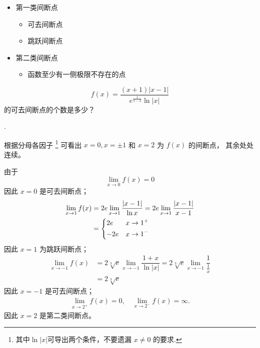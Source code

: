 \begin{itemize}
    \item 第一类间断点
        \begin{itemize} 
            \item 可去间断点
            \item 跳跃间断点
        \end{itemize}
    \item 第二类间断点
        \begin{itemize}
            \item 函数至少有一侧极限不存在的点
        \end{itemize}
\end{itemize}

\begin{example}
    \[
        f(x) = \dfrac{(x+1) | x-1 |}{e^{\frac{1}{x-2}} \ln |x|}
    \]
    的可去间断点的个数是多少？

    \cite[page 46, pdf 57, example 4]{we}.

    根据分母各因子
    \footnote{其中$\ln |x|$可导出两个条件，不要遗漏 $x \neq 0$ 的要求.}
    可看出 $x = 0, x = \pm 1$ 和 $x = 2$ 为 $f(x)$ 的间断点，
    其余处处连续。

    由于
    \[
        \lim_{x \to 0} f(x) = 0
    \]
    因此 $x = 0$ 是可去间断点；
    \begin{align*}
        \lim_{x \to 1} f(x) &= 2e \lim_{x\to 1} \dfrac{|x - 1|}{\ln x} = 2e \lim_{x\to 1} \dfrac{|x - 1|}{x - 1} \\
                            &= 
                            \begin{dcases}
                                2e & x \to 1^+ \\
                                -2e & x \to 1^-
                            \end{dcases}
    \end{align*}
    因此 $x = 1$ 为跳跃间断点；
    \begin{align*}
        \lim_{x \to -1} f(x) &= 2 \sqrt[3]{e} \lim_{x \to -1} \dfrac{1 + x}{\ln |x|} = 2 \sqrt[3]{e} \lim_{x \to -1} \dfrac{1}{\frac{1}{x}} \\
                             &= 2 \sqrt[3]{e}
    \end{align*}
    因此 $x = -1$ 是可去间断点；
    \begin{align*}
        \lim_{x \to 2^+} f(x) = 0, \quad \lim_{x \to 2^-} f(x) = \infty.
    \end{align*}
    因此 $x = 2$ 是第二类间断点。
\end{example}

